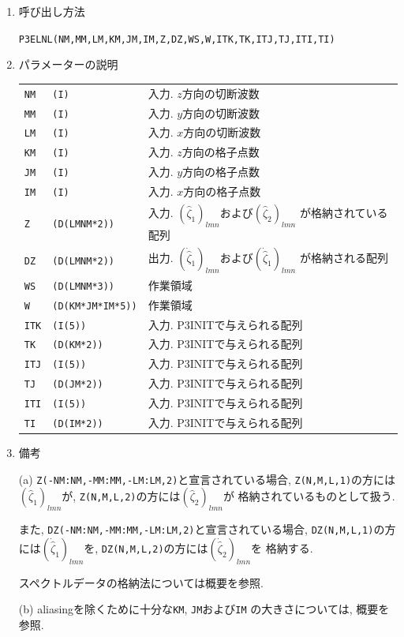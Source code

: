\documentclass[a4j,fleqn]{jarticle}
\begin{document}
\begin{enumerate}
\item 呼び出し方法 

{\tt P3ELNL(NM,MM,LM,KM,JM,IM,Z,DZ,WS,W,ITK,TK,ITJ,TJ,ITI,TI)}
  
\item パラメーターの説明

\begin{tabular}{lll}
{\tt NM} & {\tt (I)} & 入力. $z$方向の切断波数\\
{\tt MM} & {\tt (I)} & 入力. $y$方向の切断波数\\
{\tt LM} & {\tt (I)} & 入力. $x$方向の切断波数\\
{\tt KM} & {\tt (I)} & 入力. $z$方向の格子点数\\
{\tt JM} & {\tt (I)} & 入力. $y$方向の格子点数\\
{\tt IM} & {\tt (I)} & 入力. $x$方向の格子点数\\
{\tt Z} & {\tt (D(LMNM*2))} & 
 入力. $(\hat{\zeta}_1)_{lmn}$および$(\hat{\zeta}_2)_{lmn}$
  が格納されている配列\\
{\tt DZ} & {\tt (D(LMNM*2))} & 
 出力. $(\dot{\hat{\zeta}}_1)_{lmn}$および$(\dot{\hat{\zeta}}_1)_{lmn}$
 が格納される配列\\
{\tt WS} & {\tt (D(LMNM*3))} & 作業領域\\
{\tt W} & {\tt (D(KM*JM*IM*5))} & 作業領域\\
{\tt ITK} & {\tt (I(5))} & 入力. P3INITで与えられる配列\\
{\tt TK} & {\tt (D(KM*2))} & 入力. P3INITで与えられる配列\\
{\tt ITJ} & {\tt (I(5))} & 入力. P3INITで与えられる配列\\
{\tt TJ} & {\tt (D(JM*2))} & 入力. P3INITで与えられる配列\\
{\tt ITI} & {\tt (I(5))} & 入力. P3INITで与えられる配列\\
{\tt TI} & {\tt (D(IM*2))} & 入力. P3INITで与えられる配列
\end{tabular}

\item 備考

(a) {\tt Z(-NM:NM,-MM:MM,-LM:LM,2)}と宣言されている場合,
    {\tt Z(N,M,L,1)}の方には$(\hat{\zeta}_1)_{lmn}$が,
    {\tt Z(N,M,L,2)}の方には$(\hat{\zeta}_2)_{lmn}$が
    格納されているものとして扱う.
    
    また, 
    {\tt DZ(-NM:NM,-MM:MM,-LM:LM,2)}と宣言されている場合,
    {\tt DZ(N,M,L,1)}の方には$(\dot{\hat{\zeta}}_1)_{lmn}$を,
    {\tt DZ(N,M,L,2)}の方には$(\dot{\hat{\zeta}}_2)_{lmn}$を
    格納する.
        
    スペクトルデータの格納法については概要を参照.

(b) aliasingを除くために十分な{\tt KM}, {\tt JM}および{\tt IM}
の大きさについては, 概要を参照.

\end{enumerate}
\end{document}
